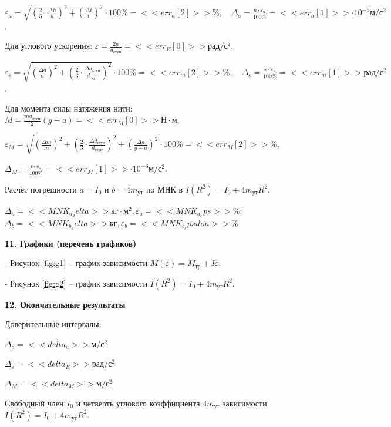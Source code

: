 \documentclass[14pt]{extreport}
\begin{document}
\centerline{$\varepsilon_{a} = \sqrt{(\frac{2}{3} \cdot \frac{\Delta h}{h})^2 + (\frac{\Delta t}{t})^2} \cdot 100\% = <<err_a[2]>>\%, \quad \Delta_a=\frac{a \cdot \varepsilon_a}{100\%} = <<err_a[1]>> \cdot 10^{-5} \text{м}/\text{с}^2$.}

Для углового ускорения: $\varepsilon=\frac{2a}{d_\text{ступ}} = <<err_E[0]>> \text{рад}/\text{с}^2$, 

\centerline{$\varepsilon_{\varepsilon} = \sqrt{(\frac{\Delta a}{a})^2 + (\frac{2}{3} \cdot \frac{\Delta d_\text{ступ}}{d_\text{ступ}})^2} \cdot 100\% = <<err_m[2]>>\%, \quad \Delta_\varepsilon=\frac{\varepsilon \cdot \varepsilon_\varepsilon}{100\%} = <<err_m[1]>> \text{рад}/\text{с}^2$.}

Для момента силы натяжения нити: $M=\frac{md_\text{ступ}}{2}(g-a) = <<err_M[0]>> \text{Н}\cdot\text{м}$, 

\centerline{$\varepsilon_M = \sqrt{(\frac{\Delta m}{m})^2 + (\frac{2}{3} \cdot \frac{\Delta d_\text{ступ}}{d_\text{ступ}})^2 + (\frac{\Delta a}{g-a})^2} \cdot 100\% = <<err_M[2]>>\%$,}

\centerline{$\Delta_M=\frac{\varepsilon \cdot \varepsilon_\varepsilon}{100\%} = <<err_M[1]>> \cdot 10^{-6} \text{м}/\text{с}^2$.}

Расчёт погрешности $a = I_0$ и $b = 4m_\text{ут}$ по МНК в $I(R^2) = I_0 + 4 m_\text{ут} R^2$.

\centerline{$\Delta_a=<<MNK_a_delta>> \text{кг}\cdot\text{м}^2, \varepsilon_a=<<MNK_a_eps>>\%$; $\Delta_b=<<MNK_b_delta>> \text{кг}, \varepsilon_b=<<MNK_b_epsilon>>\%$}

\noindent\textbf{11. Графики (перечень графиков)}

- Рисунок \ref{fig:g1} -- график зависимости $M(\varepsilon) = M_\text{тр}+I\varepsilon$.

- Рисунок \ref{fig:g2} -- график зависимости $I(R^2) = I_0+4m_\text{ут}R^2$.

\noindent\textbf{12. Окончательные результаты}

Доверительные интервалы:

\centerline{$\Delta_a = <<delta_a>> \text{м}/\text{с}^2$}

\centerline{$\Delta_\varepsilon= <<delta_E>> \text{рад}/\text{с}^2$}

\centerline{$\Delta_M = <<delta_M>> \text{м}/\text{с}^2$}

Свободный член $I_0$ и четверть углового коэффициента $4m_\text{ут}$ зависимости $I(R^2) = I_0+4m_\text{ут}R^2$.
\end{document}
